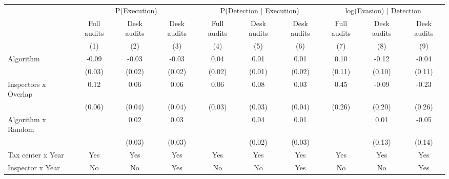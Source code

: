 \begin{tabular}{lccc|ccc|ccc} \toprule
\multicolumn{1}{l}{} & \multicolumn{3}{c}{P(Execution)} & \multicolumn{3}{c}{P(Detection | Execution)} & \multicolumn{3}{c}{log(Evasion) | Detection} \\\cmidrule(lr){2-4}\cmidrule(lr){5-7}\cmidrule(lr){8-10} \multicolumn{1}{l}{} & Full audits & Desk audits & Desk audits & Full audits & Desk audits & Desk audits & Full audits & Desk audits & Desk audits \\ \multicolumn{1}{l}{} & (1) & (2) & (3) & (4) & (5) & (6) & (7) & (8) & (9) \\ \midrule
Algorithm   &       -0.09\sym{***}&       -0.03\sym{*}  &       -0.03\sym{*}  &        0.04\sym{**} &        0.01         &        0.01         &        0.10         &       -0.12         &       -0.04         \\
            &      (0.03)         &      (0.02)         &      (0.02)         &      (0.02)         &      (0.01)         &      (0.02)         &      (0.11)         &      (0.10)         &      (0.11)         \\
\addlinespace
Inspectors x Overlap&        0.12\sym{*}  &        0.06\sym{*}  &        0.06         &        0.06\sym{*}  &        0.08\sym{**} &        0.03         &        0.45\sym{*}  &       -0.09         &       -0.23         \\
            &      (0.06)         &      (0.04)         &      (0.04)         &      (0.03)         &      (0.03)         &      (0.04)         &      (0.26)         &      (0.20)         &      (0.26)         \\
\addlinespace
Algorithm x Random&                     &        0.02         &        0.03         &                     &        0.04\sym{*}  &        0.01         &                     &        0.01         &       -0.05         \\
            &                     &      (0.03)         &      (0.03)         &                     &      (0.02)         &      (0.03)         &                     &      (0.13)         &      (0.14)         \\
\midrule
Tax center x Year&         Yes         &         Yes         &         Yes         &         Yes         &         Yes         &         Yes         &         Yes         &         Yes         &         Yes         \\
Inspector x Year&          No         &          No         &         Yes         &          No         &          No         &         Yes         &          No         &          No         &         Yes         \\

\end{tabular}
